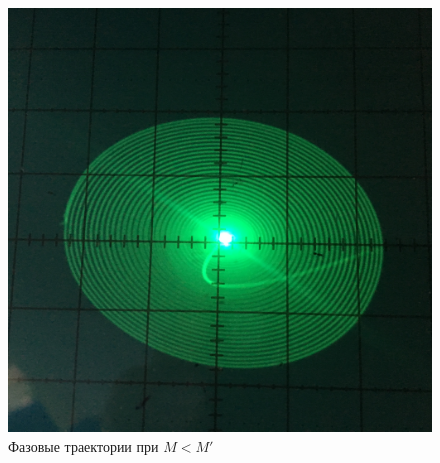\begin{figure}[h]
\begin{minipage}{0.32\linewidth}
	\end{minipage}
	\begin{minipage}{0.32\linewidth}
	\includegraphics[width=\linewidth]{photo/task2c(leftL).jpg}
	\end{minipage}
	\caption{Фазовые траектории при $M<M'$}
	\label{fig9}
\end{figure}
\vspace{-30pt}
